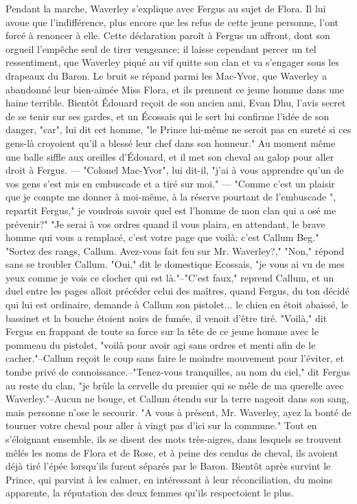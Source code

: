 Pendant la marche, Waverley s'explique avec Fergus au sujet de Flora. Il lui avoue que l'indifférence, plus encore que les refus de cette jeune personne, l'ont forcé à renoncer à elle. Cette déclaration paroît à Fergus un affront, dont son orgueil l'empêche seul de tirer vengeance; il laisse cependant percer\setcounter{page}{362}  un tel ressentiment, que Waverley piqué au vif quitte son clan et va s'engager sous les drapeaux du Baron. Le bruit se répand parmi les Mac-Yvor, que Waverley a abandonné leur bien-aimée Miss Flora, et ils prennent ce jeune homme dans une haine terrible. Bientôt Édouard reçoit de son ancien ami, Evan Dhu, l'avis secret de se tenir sur ses gardes, et un Écossais qui le sert lui confirme l'idée de son danger, "car", lui dit cet homme, "le Prince lui-même ne seroit pas en sureté si ces gens-là croyoient qu'il a blessé leur chef dans son honneur." Au moment même une balle siffle aux oreilles d'Édouard, et il met son cheval au galop pour aller droit à Fergus. — "Colonel Mac-Yvor", lui dit-il, "j'ai à vous apprendre qu'un de vos gens s'est mis en embuscade et a tiré sur moi." — "Comme c'est un plaisir que je compte me donner à moi-même, à la réserve pourtant de l'embuscade ", repartit Fergus," je voudrois savoir quel est l'homme de mon clan qui a osé me prévenir?" "Je serai à vos ordres quand il vous plaira, en attendant, le brave homme qui vous a remplacé, c'est votre page que voilà: c'est Callum Beg." "Sortez des rangs, Callum. Avez-vous fait feu sur Mr. Waverley?,"\setcounter{page}{363} "Non," répond sans se troubler Callum.
"Oui," dit le domestique Ecossais, "je vous ai vu de mes yeux comme je vois ce clocher qui est là."--"C'est faux," reprend Callum, et un duel entre les pages alloit précéder celui des maîtres, quand Fergus, du ton décidé qui lui est ordinaire, demande à Callum son pistolet... le chien en étoit abaissé, le bassinet et la bouche étoient noirs de fumée, il venoit d'être tiré.
"Voilà," dit Fergus en frappant de toute sa force sur la tête de ce jeune homme avec le pommeau du pistolet, "voilà pour avoir agi sans ordres et menti afin de le cacher."--Callum reçoit le coup sans faire le moindre mouvement pour l'éviter, et tombe privé de connoissance.--"Tenez-vous tranquilles, au nom du ciel," dit Fergus au reste du clan, "je brûle la cervelle du premier qui se mêle de ma querelle avec Waverley."--Aucun ne bouge, et Callum étendu sur la terre nageoit dans son sang, mais personne n'ose le secourir.
"A vous à présent, Mr. Waverley, ayez la bonté de tourner votre cheval pour aller à vingt pas d'ici sur la commune." Tout en s'éloignant ensemble, ils se disent des mots très-aigres, dans lesquels se trouvent mêlés les noms de Flora et de Rose, et à peine des\setcounter{page}{364} cendus de cheval, ils avoient déjà tiré l'épée lorsqu'ils furent séparés par le Baron. Bientôt après survint le Prince, qui parvint à les calmer, en intéressant à leur réconciliation, du moins apparente, la réputation des deux femmes qu'ils respectoient le plus.
